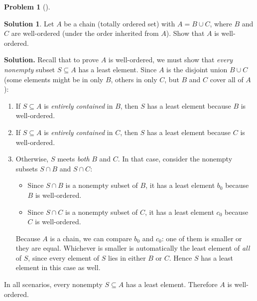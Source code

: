 \documentclass[12pt]{article}
\theoremstyle{definition} %
\newtheorem{solution}{Solution}
\newtheorem{problem}{Problem}
\theoremstyle{plain} %
\begin{document}
\begin{problem}[]
    
\end{problem}
\begin{solution}
    Let $A$ be a chain (totally ordered set) with $A = B \cup C$, where $B$ and $C$ are well-ordered (under the order inherited from $A$).  Show that $A$ is well-ordered.
    
    \bigskip
    
    \noindent
    \textbf{Solution.}\;  
    Recall that to prove $A$ is well-ordered, we must show that \emph{every nonempty} subset $S \subseteq A$ has a least element.  
    Since $A$ is the disjoint union $B \cup C$ (some elements might be in only $B$, others in only $C$, but $B$ and $C$ cover all of $A$):
    
    \begin{enumerate}
    \item If $S \subseteq A$ is \emph{entirely contained} in $B$, then $S$ has a least element because $B$ is well-ordered.
    \item If $S \subseteq A$ is \emph{entirely contained} in $C$, then $S$ has a least element because $C$ is well-ordered.
    \item Otherwise, $S$ meets \emph{both} $B$ and $C$.  In that case, consider the nonempty subsets $S \cap B$ and $S \cap C$:
    
    \begin{itemize}
    \item Since $S \cap B$ is a nonempty subset of $B$, it has a least element $b_0$ because $B$ is well-ordered.
    \item Since $S \cap C$ is a nonempty subset of $C$, it has a least element $c_0$ because $C$ is well-ordered.
    \end{itemize}
    
    Because $A$ is a chain, we can compare $b_0$ and $c_0$: one of them is smaller or they are equal.  Whichever is smaller is automatically the least element of \emph{all} of $S$, since every element of $S$ lies in either $B$ or $C$.  Hence $S$ has a least element in this case as well.
    \end{enumerate}
    
    In all scenarios, every nonempty $S \subseteq A$ has a least element.  
    Therefore $A$ is well-ordered.
     
\end{solution}
\end{document}
